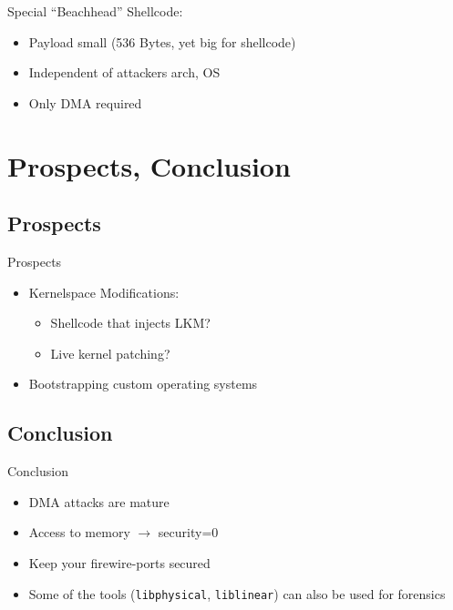 \documentclass{beamer}
\newenvironment{itemizeframe}[1]
  {\begin{frame}{#1}\startitemizeframe}
  {\stopitemizeframe\end{frame}}
\newcommand\startitemizeframe{\begin{itemize}}
\newcommand\stopitemizeframe{\end{itemize}}
\begin{document}
		\begin{frame}
			Special ``Beachhead'' Shellcode: \\
		\end{frame}
		
		\begin{itemizeframe}{}
			\item Payload small (536 Bytes, yet big for shellcode)
			\item Independent of attackers arch, OS
			\item Only DMA required
		\end{itemizeframe}


\section{Prospects, Conclusion}

	\subsection{Prospects}
		\begin{itemizeframe}{Prospects}
			\item Kernelspace Modifications:
			\begin{itemize} 
				\item Shellcode that injects LKM?
				\item Live kernel patching?
			\end{itemize}
			\item Bootstrapping custom operating systems
		\end{itemizeframe}

	\subsection{Conclusion}

		\begin{itemizeframe}{Conclusion}
			\item DMA attacks are mature
			\item Access to memory $\rightarrow$ security=0
			\item Keep your firewire-ports secured
			\item Some of the tools (\texttt{libphysical}, \texttt{liblinear}) can also be used for forensics
		\end{itemizeframe}

\AtBeginSection{ }

\section*{}
\end{document}
